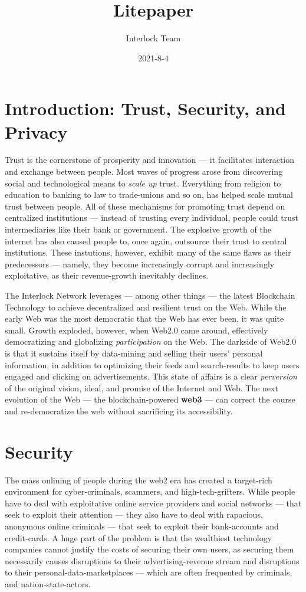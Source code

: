 \documentclass[a4paper]{article}
\title{Litepaper}
\author{Interlock Team}
\date{2021-8-4}
\begin{document}
\maketitle
\tableofcontents
\section{Introduction: Trust, Security, and Privacy}
\label{Introduction: Trust, Security, and Privacy}

Trust is the cornerstone of prosperity and innovation ---  it facilitates interaction and exchange between people. Most waves of progress arose from discovering social and technological means to \emph{scale up} trust. Everything from religion to education to banking to law to trade-unions and so on, has helped scale mutual trust between people. All of these mechanisms for promoting trust depend on centralized institutions ---  instead of trusting every individual, people could trust intermediaries like their bank or government. The explosive growth of the internet has also caused people to, once again, outsource their trust to central institutions. These instutions, however, exhibit many of the same flaws as their predecessors ---  namely, they become increasingly corrupt and increasingly exploitative, as their revenue-growth inevitably declines.

The Interlock Network leverages ---  among other things ---  the latest Blockchain Technology to achieve decentralized and resilient trust on the Web. While the early Web was the most democratic that the Web has ever been, it was quite small. Growth exploded, however, when Web2.0 came around, effectively democratizing and globalizing \emph{participation} on the Web. The darkside of Web2.0 is that it sustains itself by data-mining and selling their users' personal information, in addition to optimizing their feeds and search-results to keep users engaged and clicking on advertisements. This state of affairs is a clear \emph{perversion} of the original vision, ideal, and promise of the Internet and Web. The next evolution of the Web ---  the blockchain-powered \textbf{web3} ---  can correct the course and re-democratize the web without sacrificing its accessibility.
\section{Security}
\label{Security}

The mass onlining of people during the web2 era has created a target-rich environment for cyber-criminals, scammers, and high-tech-grifters. While people have to deal with exploitative online service providers and social networks ---  that seek to exploit their attention ---  they also have to deal with rapacious, anonymous online criminals ---  that seek to exploit their bank-accounts and credit-cards. A huge part of the problem is that the wealthiest technology companies cannot justify the costs of securing their own users, as securing them necessarily causes disruptions to their advertising-revenue stream and disruptions to their personal-data-marketplaces ---  which are often frequented by criminals, and nation-state-actors.
\end{document}
